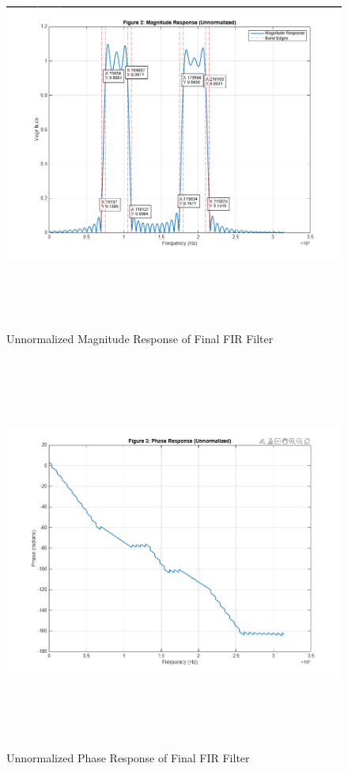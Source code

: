 \documentclass[12pt]{article}
\begin{document}
\begin{figure}[H]
    \centering
    \includegraphics[height=13cm]{2.png}
    \caption{Unnormalized Magnitude Response of Final FIR Filter}
    \label{fig:final_mag_response}
\end{figure}

\begin{figure}[H]
    \centering
    \includegraphics[height=13cm]{3.png}
    \caption{Unnormalized Phase Response of Final FIR Filter}
    \label{fig:final_phase_response}
\end{figure}
\end{document}
